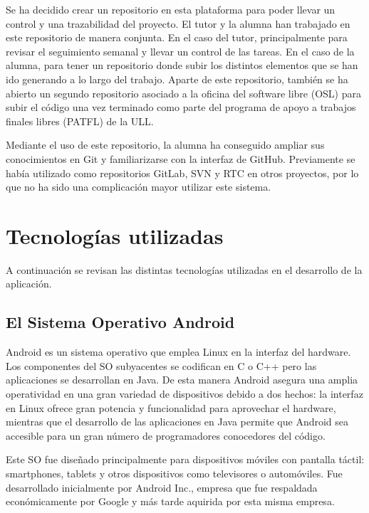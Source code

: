 Se ha decidido crear un repositorio en esta plataforma para poder llevar un control y una trazabilidad del proyecto. El tutor y la alumna han trabajado en este repositorio de manera conjunta. En el caso del tutor, principalmente para revisar el seguimiento semanal y llevar un control de las tareas. En el caso de la alumna, para tener un repositorio donde subir los distintos elementos que se han ido generando a lo largo del trabajo. Aparte de este repositorio, también se ha abierto un segundo repositorio \cite{URL::repositorioAplicacion} asociado a la oficina del software libre (OSL) para subir el código una vez terminado como parte del programa de apoyo a trabajos finales libres (PATFL) \cite{URL::PATFL} de la ULL.


Mediante el uso de este repositorio, la alumna ha conseguido ampliar sus conocimientos en Git y familiarizarse con la interfaz de GitHub. Previamente se había utilizado como repositorios GitLab, SVN y RTC en otros proyectos, por lo que no ha sido una complicación mayor utilizar este sistema.

\section{Tecnologías utilizadas}

A continuación se revisan las distintas tecnologías utilizadas en el desarrollo de la aplicación.

\subsection{El Sistema Operativo Android}

Android es un sistema operativo que emplea Linux en la interfaz del hardware.  Los componentes del SO subyacentes se codifican en C o C++ pero las aplicaciones se desarrollan en Java. De esta manera Android asegura una amplia operatividad en una gran variedad de dispositivos debido a dos hechos: la interfaz en Linux ofrece gran potencia y funcionalidad para aprovechar el hardware, mientras que el desarrollo de las aplicaciones en Java permite que Android sea accesible para un gran número de programadores conocedores del código.

Este SO fue diseñado principalmente para dispositivos móviles con pantalla táctil: smartphones, tablets y otros dispositivos como televisores o automóviles. Fue desarrollado inicialmente por Android Inc., empresa que fue respaldada económicamente por Google y más tarde aquirida por esta misma empresa.

